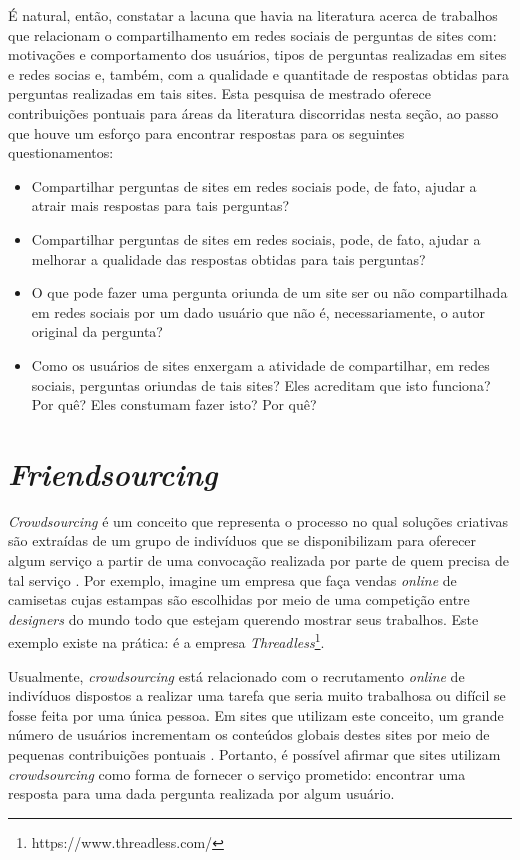 É natural, então, constatar a lacuna que havia na literatura acerca de trabalhos que relacionam o compartilhamento em redes sociais de perguntas de sites \qa com: motivações e comportamento dos usuários, tipos de perguntas realizadas em sites \qa e redes socias e, também, com a qualidade e quantitade de respostas obtidas para perguntas realizadas em tais sites. Esta pesquisa de mestrado oferece contribuições pontuais para áreas da literatura discorridas nesta seção, ao passo que houve um esforço para encontrar respostas para os seguintes questionamentos:

    \begin{itemize}
        \item Compartilhar perguntas de sites \qa em redes sociais pode, de fato, ajudar a atrair mais respostas para tais perguntas?
        \item Compartilhar perguntas de sites \qa em redes sociais, pode, de fato, ajudar a melhorar a qualidade das respostas obtidas para tais perguntas?
        \item O que pode fazer uma pergunta oriunda de um site \qa ser ou não compartilhada em redes sociais por um dado usuário que não é, necessariamente, o autor original da pergunta? 
        \item Como os usuários de sites \qa enxergam a atividade de compartilhar, em redes sociais, perguntas oriundas de tais sites? Eles acreditam que isto funciona? Por quê? Eles constumam fazer isto? Por quê?
    \end{itemize}

\section{\textit{Friendsourcing}}
\textit{Crowdsourcing} é um conceito que representa o processo no qual soluções criativas são extraídas de um grupo de indivíduos que se disponibilizam para oferecer algum serviço a partir de uma convocação realizada por parte de quem precisa de tal serviço \cite{brabham2008crowdsourcing}. Por exemplo, imagine um empresa que faça vendas \textit{online} de camisetas cujas estampas são escolhidas por meio de uma competição entre \textit{designers} do mundo todo que estejam querendo mostrar seus trabalhos. Este exemplo existe na prática: é a empresa \textit{Threadless}\footnote{https://www.threadless.com/}.

Usualmente, \textit{crowdsourcing} está relacionado com o recrutamento \textit{online} de indivíduos dispostos a realizar uma tarefa que seria muito trabalhosa ou difícil se fosse feita por uma única pessoa. Em sites que utilizam este conceito, um grande número de usuários incrementam os conteúdos globais destes sites por meio de pequenas contribuições pontuais \cite{Bernstein:2008:PVF:1746259.1746260}. Portanto, é possível afirmar que sites \qa utilizam \textit{crowdsourcing} como forma de fornecer o serviço prometido: encontrar uma resposta para uma dada pergunta realizada por algum usuário.

